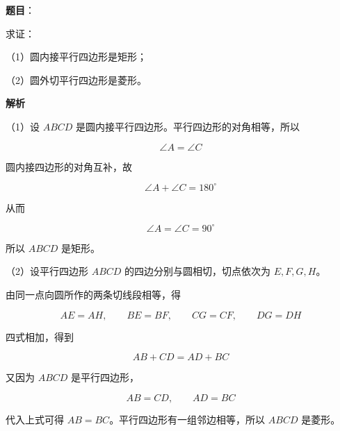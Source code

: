 \begin{answer}

\textbf{题目}：

求证：

（1）圆内接平行四边形是矩形；

（2）圆外切平行四边形是菱形。

\textbf{解析}

（1）设 $ABCD$ 是圆内接平行四边形。平行四边形的对角相等，所以

\nopagebreak[4]
\[
\angle A=\angle C
\]

圆内接四边形的对角互补，故

\nopagebreak[4]
\[
\angle A+\angle C=180^\circ
\]

从而

\nopagebreak[4]
\[
\angle A=\angle C=90^\circ
\]

所以 $ABCD$ 是矩形。
\nopagebreak[4]
\begin{center}\end{center}
\nopagebreak[4]
（2）设平行四边形 $ABCD$ 的四边分别与圆相切，切点依次为 $E,F,G,H$。
\nopagebreak[4]
\begin{center}\end{center}
\nopagebreak[4]
由同一点向圆所作的两条切线段相等，得

\nopagebreak[4]
\[
AE=AH,\qquad BE=BF,\qquad CG=CF,\qquad DG=DH
\]

四式相加，得到

\nopagebreak[4]
\[
AB+CD=AD+BC
\]

又因为 $ABCD$ 是平行四边形，

\nopagebreak[4]
\[
AB=CD,\qquad AD=BC
\]

代入上式可得 $AB=BC$。平行四边形有一组邻边相等，所以 $ABCD$ 是菱形。


\end{answer}
